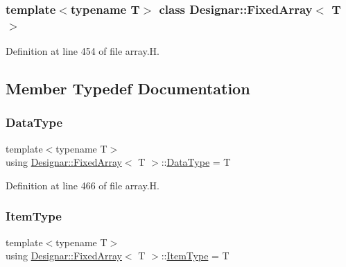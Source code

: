 \subsubsection*{template$<$typename T$>$\newline
class Designar\+::\+Fixed\+Array$<$ T $>$}



Definition at line 454 of file array.\+H.



\subsection{Member Typedef Documentation}
\mbox{\label{class_designar_1_1_fixed_array_a3e37931b909b840cb7a40fc73f12bcf5}} 
\subsubsection{\texorpdfstring{Data\+Type}{DataType}}
{\footnotesize\ttfamily template$<$typename T$>$ \\
using \hyperlink{class_designar_1_1_fixed_array}{Designar\+::\+Fixed\+Array}$<$ T $>$\+::\hyperlink{class_designar_1_1_fixed_array_a3e37931b909b840cb7a40fc73f12bcf5}{Data\+Type} =  T}



Definition at line 466 of file array.\+H.

\mbox{\label{class_designar_1_1_fixed_array_abfeb4e683cee75ae782ad20294c4c808}} 
\subsubsection{\texorpdfstring{Item\+Type}{ItemType}}
{\footnotesize\ttfamily template$<$typename T$>$ \\
using \hyperlink{class_designar_1_1_fixed_array}{Designar\+::\+Fixed\+Array}$<$ T $>$\+::\hyperlink{class_designar_1_1_fixed_array_abfeb4e683cee75ae782ad20294c4c808}{Item\+Type} =  T}



